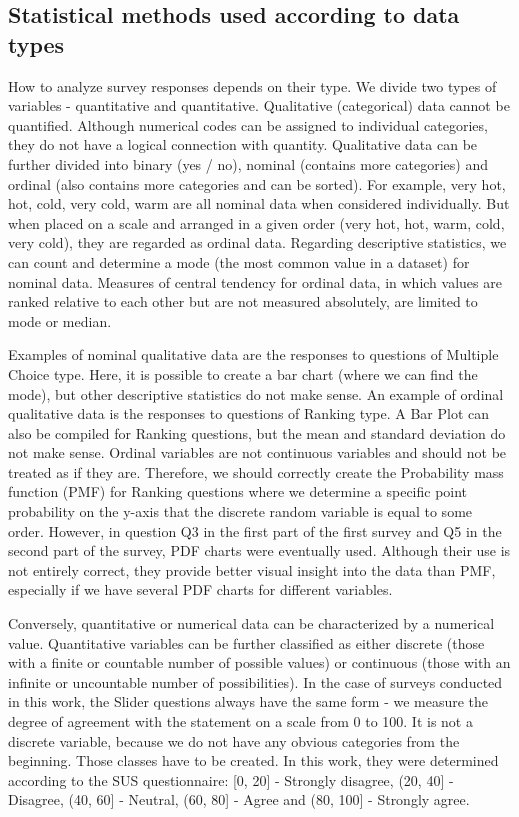 \documentclass[a4paper,10pt,twoside]{article}
\begin{document}
\subsection{Statistical methods used according to data types}

How to analyze survey responses depends on their type. We divide two types of variables - quantitative and quantitative. Qualitative (categorical) data cannot be quantified. Although numerical codes can be assigned to individual categories, they do not have a logical connection with quantity. Qualitative data can be further divided into binary (yes / no), nominal (contains more categories) and ordinal (also contains more categories and can be sorted). For example, very hot, hot, cold, very cold, warm are all nominal data when considered individually. But when placed on a scale and arranged in a given order (very hot, hot, warm, cold, very cold), they are regarded as ordinal data. Regarding descriptive statistics, we can count and determine a mode (the most common value in a dataset) for nominal data. Measures of central tendency for ordinal data, in which values are ranked relative to each other but are not measured absolutely, are limited to mode or median.

Examples of nominal qualitative data are the responses to questions of Multiple Choice type. Here, it is possible to create a bar chart (where we can find the mode), but other descriptive statistics do not make sense. An example of ordinal qualitative data is the responses to questions of Ranking type. A Bar Plot can also be compiled for Ranking questions, but the mean and standard deviation do not make sense. Ordinal variables are not continuous variables and should not be treated as if they are. Therefore, we should correctly create the Probability mass function (PMF) for Ranking questions where we determine a specific point probability on the y-axis that the discrete random variable is equal to some order. However, in question Q3 in the first part of the first survey and Q5 in the second part of the survey, PDF charts were eventually used. Although their use is not entirely correct, they provide better visual insight into the data than PMF, especially if we have several PDF charts for different variables.

Conversely, quantitative or numerical data can be characterized by a numerical value. Quantitative variables can be further classified as either discrete (those with a finite or countable number of possible values) or continuous (those with an infinite or uncountable number of possibilities). In the case of surveys conducted in this work, the Slider questions always have the same form - we measure the degree of agreement with the statement on a scale from 0 to 100. It is not a discrete variable, because we do not have any obvious categories from the beginning. Those classes have to be created. In this work, they were determined according to the SUS questionnaire: [0, 20] - Strongly disagree, (20, 40] - Disagree, (40, 60] - Neutral, (60, 80] - Agree and (80, 100] - Strongly agree.
\end{document}
